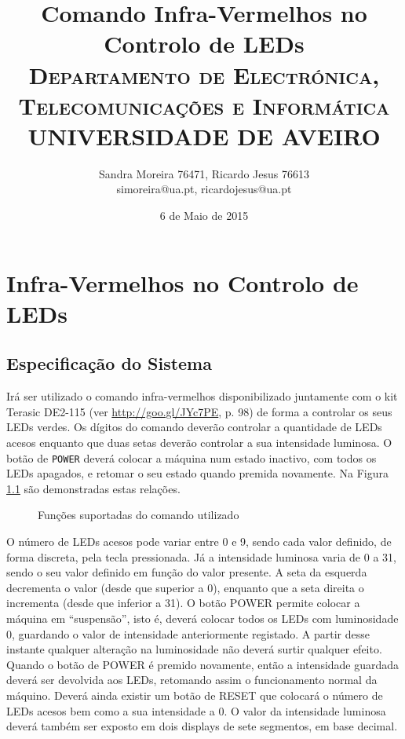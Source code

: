 \documentclass[a4paper,11pt,openright,oneside]{report}
\begin{document}
\title{\textbf{Comando Infra-Vermelhos no Controlo de LEDs}\\[1cm]\textsc{\small {Departamento de Electrónica, Telecomunicações e Informática} \\ \large {UNIVERSIDADE DE AVEIRO}}}
\author{Sandra Moreira 76471, Ricardo Jesus 76613\\simoreira@ua.pt, ricardojesus@ua.pt}
\date{6 de Maio de 2015}
\maketitle
{}

\chapter{Infra-Vermelhos no Controlo de LEDs}

\section{Especificação do Sistema}
\label{sec:especificação}

Irá ser utilizado o comando infra-vermelhos disponibilizado juntamente com o kit Terasic DE2-115 (ver \url{http://goo.gl/JYc7PE}, p. 98) de forma a controlar os seus LEDs verdes. Os dígitos do comando deverão controlar a quantidade de LEDs acesos enquanto que duas setas deverão controlar a sua intensidade luminosa. O botão de \verb|POWER| deverá colocar a máquina num estado inactivo, com todos os LEDs apagados, e retomar o seu estado quando premida novamente. Na Figura \ref{fig:ir_leds0} são demonstradas estas relações.

\begin{figure}[ht]
\center
{}
\caption{Funções suportadas do comando utilizado}
\label{fig:ir_leds0}
\end{figure}

O número de LEDs acesos pode variar entre 0 e 9, sendo cada valor definido, de forma discreta, pela tecla pressionada. Já a intensidade luminosa varia de 0 a 31, sendo o seu valor definido em função do valor presente. A seta da esquerda decrementa o valor (desde que superior a 0), enquanto que a seta direita o incrementa (desde que inferior a 31). O botão POWER permite colocar a máquina em ``suspensão'', isto é, deverá colocar todos os LEDs com luminosidade 0, guardando o valor de intensidade anteriormente registado. A partir desse instante qualquer alteração na luminosidade não deverá surtir qualquer efeito. Quando o botão de POWER é premido novamente, então a intensidade guardada deverá ser devolvida aos LEDs, retomando assim o funcionamento normal da máquino. Deverá ainda existir um botão de RESET que colocará o número de LEDs acesos bem como a sua intensidade a 0. O valor da intensidade luminosa deverá também ser exposto em dois displays de sete segmentos, em base decimal.
\end{document}
